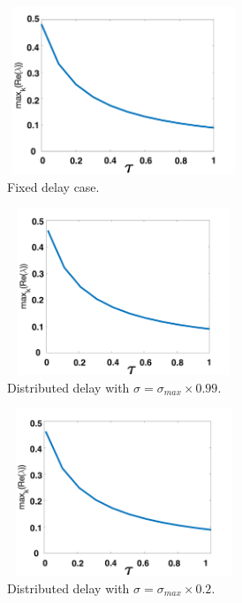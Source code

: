 \documentclass[12pt]{report}
\begin{document}
\begin{figure}[H]
    \centering
    \begin{subfigure}[b]{0.45\textwidth}
        \centering
        \includegraphics[width=7cm,height=5cm]{p1fixed.png}
        \caption{Fixed delay case.}
        \label{}
    \end{subfigure}
    \hfill
    \begin{subfigure}[b]{0.45\textwidth}
        \centering
        \includegraphics[width=7cm,height=5cm]{p1sigmax.png}
        \caption{Distributed delay with $\sigma=\sigma_{max}\times0.99$.}
        \label{}
    \end{subfigure}
    \hfill
    \begin{subfigure}[b]{0.45\textwidth}
        \centering
        \includegraphics[width=7cm,height=5cm]{p1sigmax5.png}
        \caption{Distributed delay with $\sigma=\sigma_{max}\times0.2$.}
        \label{}
    \end{subfigure}
    \hfill
    \begin{subfigure}[b]{0.45\textwidth}

\end{subfigure}
\end{figure}
\end{document}
